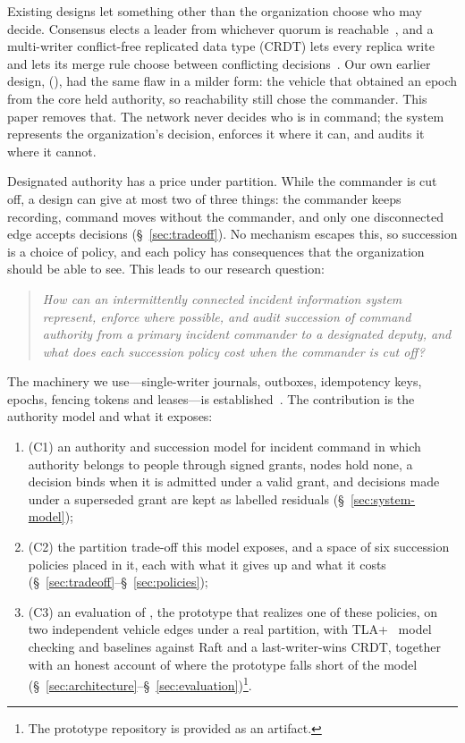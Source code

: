 Existing designs let something other than the organization choose who may decide.
Consensus elects a leader from whichever quorum is reachable~\cite{ongaro2014raft}, and a
multi-writer conflict-free replicated data type (CRDT) lets every replica write and lets
its merge rule choose between conflicting decisions~\cite{hanssen2025emergency}. Our own
earlier design, \methodname{} (\systemname{}), had the same flaw in a milder form: the
vehicle that obtained an epoch from the core held authority, so reachability still chose
the commander. This paper removes that. The network never decides who is in command; the
system represents the organization's decision, enforces it where it can, and audits it
where it cannot.

Designated authority has a price under partition. While the commander is cut off, a
design can give at most two of three things: the commander keeps recording, command moves
without the commander, and only one disconnected edge accepts decisions
(\S~\ref{sec:tradeoff}). No mechanism escapes this, so succession is a choice of policy,
and each policy has consequences that the organization should be able to see. This leads
to our research question:

\begin{quote}
\textit{How can an intermittently connected incident information system represent,
enforce where possible, and audit succession of command authority from a primary incident
commander to a designated deputy, and what does each succession policy cost when the
commander is cut off?}
\end{quote}

The machinery we use---single-writer journals, outboxes, idempotency keys, epochs, fencing
tokens and leases---is established~\cite{kleppmann2017ddia,gray1989leases}. The
contribution is the authority model and what it exposes:

\begin{enumerate}
  \item (C1) an authority and succession model for incident command in which authority
  belongs to people through signed grants, nodes hold none, a decision binds when it is
  admitted under a valid grant, and decisions made under a superseded grant are kept as
  labelled residuals (\S~\ref{sec:system-model});

  \item (C2) the partition trade-off this model exposes, and a space of six succession
  policies placed in it, each with what it gives up and what it costs
  (\S~\ref{sec:tradeoff}--\S~\ref{sec:policies});

  \item (C3) an evaluation of \systemname{}, the prototype that realizes one of these
  policies, on two independent vehicle edges under a real partition, with TLA+~\cite{tlaplus}
  model checking and baselines against Raft and a last-writer-wins CRDT, together with an
  honest account of where the prototype falls short of the model
  (\S~\ref{sec:architecture}--\S~\ref{sec:evaluation})\footnote{The prototype repository
  is provided as an artifact.}. 
\end{enumerate}
